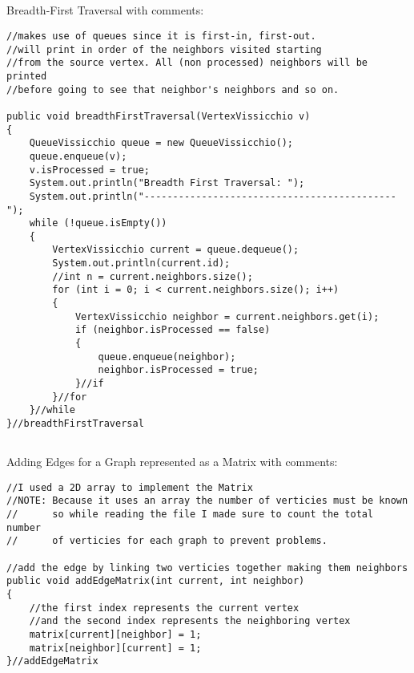 \documentclass[letterpaper, 10pt]{article}
\begin{document}
\subsection{}
Breadth-First Traversal with comments:\\
\begin{lstlisting}
//makes use of queues since it is first-in, first-out.
//will print in order of the neighbors visited starting 
//from the source vertex. All (non processed) neighbors will be printed 
//before going to see that neighbor's neighbors and so on.

public void breadthFirstTraversal(VertexVissicchio v)
{
    QueueVissicchio queue = new QueueVissicchio();
    queue.enqueue(v);
    v.isProcessed = true;
    System.out.println("Breadth First Traversal: ");
    System.out.println("--------------------------------------------");
    while (!queue.isEmpty())
    {
        VertexVissicchio current = queue.dequeue();
        System.out.println(current.id);
        //int n = current.neighbors.size();
        for (int i = 0; i < current.neighbors.size(); i++)
        {
            VertexVissicchio neighbor = current.neighbors.get(i);
            if (neighbor.isProcessed == false)
            {
                queue.enqueue(neighbor);
                neighbor.isProcessed = true;
            }//if
        }//for
    }//while
}//breadthFirstTraversal
\end{lstlisting}

\subsection{}
Adding Edges for a Graph represented as a Matrix with comments: \\
\begin{lstlisting}
//I used a 2D array to implement the Matrix
//NOTE: Because it uses an array the number of verticies must be known
//      so while reading the file I made sure to count the total number
//      of verticies for each graph to prevent problems.

//add the edge by linking two verticies together making them neighbors
public void addEdgeMatrix(int current, int neighbor)
{
    //the first index represents the current vertex
    //and the second index represents the neighboring vertex
    matrix[current][neighbor] = 1;
    matrix[neighbor][current] = 1;
}//addEdgeMatrix
\end{lstlisting}
\end{document}
